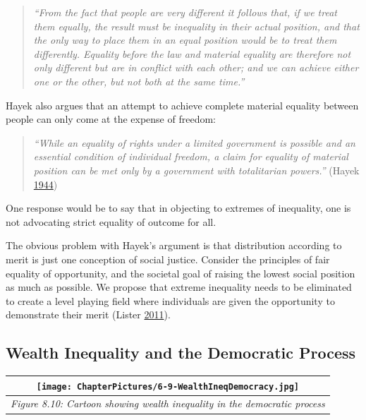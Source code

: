 \documentclass[]{tufte-handout}
\begin{document}
\begin{quote}
\emph{``From the fact that people are very different it follows that, if
we treat them equally, the result must be inequality in their actual
position, and that the only way to place them in an equal position would
be to treat them differently. Equality before the law and material
equality are therefore not only different but are in conflict with each
other; and we can achieve either one or the other, but not both at the
same time.''}
\end{quote}

Hayek also argues that an attempt to achieve complete material equality
between people can only come at the expense of freedom:

\begin{quote}
\emph{``While an equality of rights under a limited government is
possible and an essential condition of individual freedom, a claim for
equality of material position can be met only by a government with
totalitarian powers.''} (Hayek \protect\hyperlink{ref-Hayek1944}{1944})
\end{quote}

One response would be to say that in objecting to extremes of
inequality, one is not advocating strict equality of outcome for all.

The obvious problem with Hayek's argument is that distribution according
to merit is just one conception of social justice. Consider the
principles of fair equality of opportunity, and the societal goal of
raising the lowest social position as much as possible. We propose that
extreme inequality needs to be eliminated to create a level playing
field where individuals are given the opportunity to demonstrate their
merit (Lister \protect\hyperlink{ref-Lister2011}{2011}).

\hypertarget{wealth-inequality-and-the-democratic-process}{%
\subsection{Wealth Inequality and the Democratic
Process}\label{wealth-inequality-and-the-democratic-process}}

\begin{longtable}[]{@{}c@{}}
\toprule
\texttt{[image: ChapterPictures/6-9-WealthIneqDemocracy.jpg]}\tabularnewline
\midrule
\endhead
\emph{Figure 8.10: Cartoon showing wealth inequality in the democratic
process}\tabularnewline
\bottomrule
\end{longtable}
\end{document}
